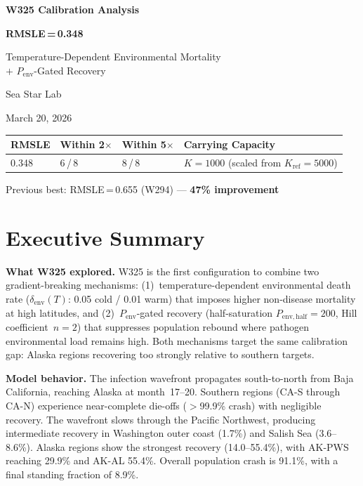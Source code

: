\documentclass[11pt,letterpaper]{article}
\begin{document}
\begin{titlepage}
\centering
\vspace*{3cm}
{\Huge\bfseries W325 Calibration Analysis\par}
\vspace{0.3cm}
{\Huge\bfseries RMSLE\,=\,0.348\par}
\vspace{1.5cm}
{\Large Temperature-Dependent Environmental Mortality\\[0.3em]
$+$ $P_{\mathrm{env}}$-Gated Recovery\par}
\vspace{2cm}
{\large Sea Star Lab\par}
\vspace{0.3cm}
{\large March 20, 2026\par}
\vspace{2cm}
\begin{tabular}{llll}
\toprule
\textbf{RMSLE} & \textbf{Within 2$\times$} & \textbf{Within 5$\times$} & \textbf{Carrying Capacity} \\
\midrule
0.348 & 6\,/\,8 & 8\,/\,8 & $K=1000$ (scaled from $K_{\mathrm{ref}}=5000$) \\
\bottomrule
\end{tabular}
\vfill
{\small Previous best: RMSLE\,=\,0.655 (W294) --- \textbf{47\% improvement}}
\end{titlepage}

\section{Executive Summary}

\textbf{What W325 explored.}
W325 is the first configuration to combine two gradient-breaking mechanisms:
(1)~temperature-dependent environmental death rate ($\delta_{\mathrm{env}}(T)$: 0.05 cold / 0.01 warm) that imposes higher non-disease mortality at high latitudes, and
(2)~$P_{\mathrm{env}}$-gated recovery (half-saturation $P_{\mathrm{env,half}}=200$, Hill coefficient~$n=2$) that suppresses population rebound where pathogen environmental load remains high.
Both mechanisms target the same calibration gap: Alaska regions recovering too strongly relative to southern targets.

\textbf{Model behavior.}
The infection wavefront propagates south-to-north from Baja California, reaching Alaska at month~17--20.
Southern regions (CA-S through CA-N) experience near-complete die-offs ($>$99.9\% crash) with negligible recovery.
The wavefront slows through the Pacific Northwest, producing intermediate recovery in Washington outer coast (1.7\%) and Salish Sea (3.6--8.6\%).
Alaska regions show the strongest recovery (14.0--55.4\%), with AK-PWS reaching 29.9\% and AK-AL 55.4\%.
Overall population crash is 91.1\%, with a final standing fraction of 8.9\%.
\end{document}
